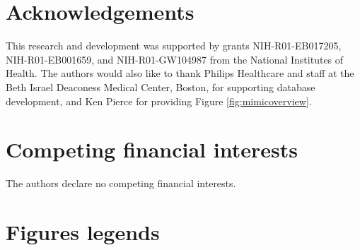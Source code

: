\documentclass[english]{article}
\begin{document}
\section*{Acknowledgements}


This research and development was supported by grants NIH-R01-EB017205, NIH-R01-EB001659, and NIH-R01-GW104987 from the National Institutes of Health. The authors would also like to thank Philips Healthcare and staff at the Beth Israel Deaconess Medical Center, Boston, for supporting database development, and Ken Pierce for providing Figure \ref{fig:mimicoverview}.

\section*{Competing financial interests}

The authors declare no competing financial interests.

\section*{Figures legends}


\end{document}
